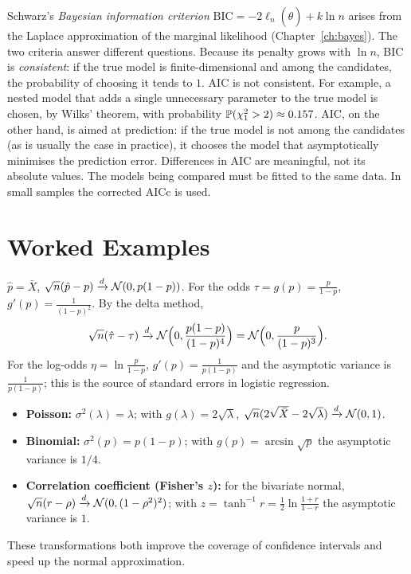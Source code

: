 \documentclass[main.tex]{subfiles}
\begin{document}
\begin{remark}\label{rem:aic-bic}
Schwarz's \emph{Bayesian information criterion} $\mathrm{BIC}=-2\ell_n(\hat\theta)+k\ln n$ \cite{schwarz78} arises from the Laplace approximation of the marginal likelihood (Chapter~\ref{ch:bayes}). The two criteria answer different questions. Because its penalty grows with $\ln n$, BIC is \emph{consistent}: if the true model is finite-dimensional and among the candidates, the probability of choosing it tends to $1$. AIC is not consistent. For example, a nested model that adds a single unnecessary parameter to the true model is chosen, by Wilks' theorem, with probability $\P(\chi^2_1>2)\approx0.157$. AIC, on the other hand, is aimed at prediction: if the true model is not among the candidates (as is usually the case in practice), it chooses the model that asymptotically minimises the prediction error. Differences in AIC are meaningful, not its absolute values. The models being compared must be fitted to the same data. In small samples the corrected AICc is used.
\end{remark}

\section{Worked Examples}

\begin{example}\label{ex:odds}
$\hat p=\bar X$, $\sqrt n(\hat p-p)\dto\Normal(0,p(1-p))$. For the odds $\tau=g(p)=\frac{p}{1-p}$, $g'(p)=\frac{1}{(1-p)^2}$. By the delta method,
\[
\sqrt n(\hat\tau-\tau)\dto\Normal\Big(0,\frac{p(1-p)}{(1-p)^4}\Big)=\Normal\Big(0,\frac{p}{(1-p)^3}\Big).
\]
For the log-odds $\eta=\ln\frac p{1-p}$, $g'(p)=\frac{1}{p(1-p)}$ and the asymptotic variance is $\frac{1}{p(1-p)}$; this is the source of standard errors in logistic regression.
\end{example}

\begin{example}\label{ex:varyans-dengeleme}
\begin{itemize}
  \item \textbf{Poisson:} $\sigma^2(\lambda)=\lambda$; with $g(\lambda)=2\sqrt\lambda$, $\sqrt n(2\sqrt{\bar X}-2\sqrt\lambda)\dto\Normal(0,1)$.
  \item \textbf{Binomial:} $\sigma^2(p)=p(1-p)$; with $g(p)=\arcsin\sqrt p$ the asymptotic variance is $1/4$.
  \item \textbf{Correlation coefficient (Fisher's $z$):} for the bivariate normal, $\sqrt n(r-\rho)\dto\Normal(0,(1-\rho^2)^2)$; with $z=\tanh^{-1}r=\frac12\ln\frac{1+r}{1-r}$ the asymptotic variance is $1$.
\end{itemize}
These transformations both improve the coverage of confidence intervals and speed up the normal approximation.
\end{example}
\end{document}
